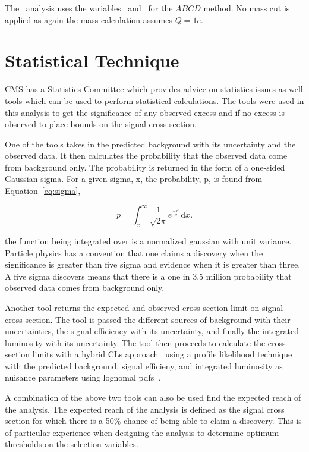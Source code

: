 The \fract\ analysis uses the variables \pt\ and \iasp\ for the $ABCD$ method. No mass cut is applied as again the mass calculation assumes $Q=1e$.

\section{Statistical Technique \label{sec:stats}}
CMS has a Statistics Committee which provides advice on statistics issues as well tools which can be used to perform statistical calculations. The tools were used
in this analysis to get the significance of any observed excess and if no excess is observed to place bounds on the signal cross-section.

One of the tools takes in the predicted background with its uncertainty and the observed data. It then calculates the probability that the observed data come from
background only. The probability is returned in the form of a one-sided Gaussian sigma. For a given sigma, x, the probability, p, is found from Equation~\ref{eq:sigma},

\begin{equation}
p = \int_x^{\infty} \frac{1}{\sqrt{2\pi}}e^{\frac{-x^2}{2}} \mathrm{d} x.
\label{eq:sigma}
\end{equation}

the function being integrated over is a normalized gaussian with unit variance. Particle physics has a convention that one claims a discovery when the significance
is greater than five sigma and evidence when it is greater than three. A five sigma discovers means that there is a one in 3.5 million probability that
observed data comes from background only.

Another tool returns the expected and observed cross-section limit on signal cross-section. The tool is passed the different sources of background with their uncertainties,
the signal efficiency with its uncertainty, and finally the integrated luminosity with its uncertainty. The tool then proceeds to calculate the cross section limits with
a hybrid CLs approach~\cite{HybridCLs} using a profile likelihood technique with the predicted background, signal efficieny, and integrated luminosity
as nuisance parameters using lognomal pdfs~\cite{Lognormal1,Lognormal2}.

A combination of the above two tools can also be used find the expected reach of the analysis. The expected reach of the analysis is defined as the signal cross section
for which there is a 50\% chance of being able to claim a discovery.
This is of particular experience when designing the analysis to determine optimum thresholds
on the selection variables.

